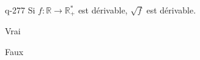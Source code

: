 \begin{truefalse}{q-277}
Si $f : \mathbb R \to \mathbb R^*_+$ est dérivable, $\sqrt f$ est dérivable.
\item* Vrai
\item Faux
\end{truefalse}

